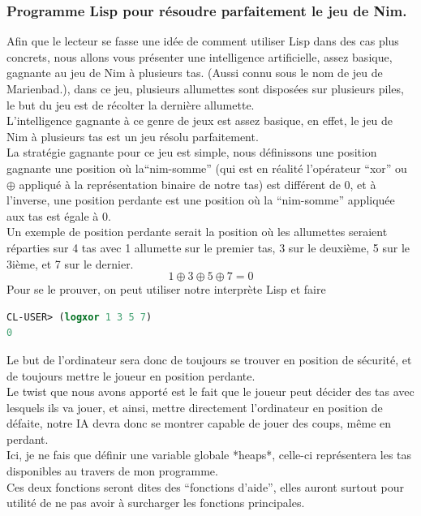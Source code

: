 \documentclass[a4paper, 12pt]{article}
\numberwithin{equation}{subsection}
\begin{document}
\subsubsection{Programme Lisp pour résoudre parfaitement le jeu de Nim.}
Afin que le lecteur se fasse une idée de comment utiliser Lisp dans des cas plus concrets, nous allons vous présenter une intelligence artificielle, assez basique, gagnante au jeu de Nim à plusieurs tas. (Aussi connu sous le nom de jeu de Marienbad.), dans ce jeu, plusieurs allumettes sont disposées sur plusieurs piles, le but du jeu est de récolter la dernière allumette. \\

L'intelligence gagnante à ce genre de jeux est assez basique, en effet, le jeu de Nim à plusieurs tas est un jeu résolu parfaitement. \\

La stratégie gagnante pour ce jeu est simple, nous définissons une position gagnante une position où la``nim-somme'' (qui est en réalité l'opérateur ``xor'' ou $\oplus$ appliqué à la représentation binaire de notre tas) est différent de 0, et à l'inverse, une position perdante est une position où la ``nim-somme'' appliquée aux tas est égale à 0. \\

Un exemple de position perdante serait la position où les allumettes seraient réparties sur 4 tas avec 1 allumette sur le premier tas, 3 sur le deuxième, 5 sur le 3ième, et 7 sur le dernier. \\
$$1 \oplus 3 \oplus 5 \oplus 7 = 0$$
Pour se le prouver, on peut utiliser notre interprète Lisp et faire
\begin{lstlisting}[language=Lisp]
CL-USER> (logxor 1 3 5 7)
0
\end{lstlisting}
Le but de l'ordinateur sera donc de toujours se trouver en position de sécurité, et de toujours mettre le joueur en position perdante. \\

Le twist que nous avons apporté est le fait que le joueur peut décider des tas avec lesquels ils va jouer, et ainsi, mettre directement l'ordinateur en position de défaite, notre IA devra donc se montrer capable de jouer des coups, même en perdant. \\

Ici, je ne fais que définir une variable globale *heaps*, celle-ci représentera les tas disponibles au travers de mon programme. \\

Ces deux fonctions seront dites des ``fonctions d'aide'', elles auront surtout pour utilité de ne pas avoir à surcharger les fonctions principales. \\
\end{document}
